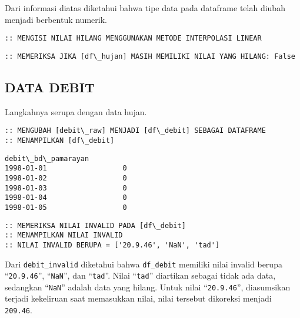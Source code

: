 \documentclass[11pt]{article}
\makeatletter
\newcommand{\boxspacing}{\kern\kvtcb@left@rule\kern\kvtcb@boxsep}
\newcommand{\prompt}[4]{
        \ttfamily\llap{{\color{#2}[#3]:\hspace{3pt}#4}}\vspace{-\baselineskip}
    }
\makeatother
\begin{document}
    Dari informasi diatas diketahui bahwa tipe data pada dataframe telah
diubah menjadi berbentuk numerik.

    \begin{Verbatim}[commandchars=\\\{\}]
:: MENGISI NILAI HILANG MENGGUNAKAN METODE INTERPOLASI LINEAR
    \end{Verbatim}

    \begin{Verbatim}[commandchars=\\\{\}]
:: MEMERIKSA JIKA [df\_hujan] MASIH MEMILIKI NILAI YANG HILANG: False
    \end{Verbatim}

    \hypertarget{data-debit}{%
\subsection{DATA DEBIT}\label{data-debit}}

Langkahnya serupa dengan data hujan.

    \begin{Verbatim}[commandchars=\\\{\}]
:: MENGUBAH [debit\_raw] MENJADI [df\_debit] SEBAGAI DATAFRAME
:: MENAMPILKAN [df\_debit]
    \end{Verbatim}

            \begin{tcolorbox}[breakable, size=fbox, boxrule=.5pt, pad at break*=1mm, opacityfill=0]
\prompt{Out}{outcolor}{0}{\boxspacing}
\begin{Verbatim}[commandchars=\\\{\}]
           debit\_bd\_pamarayan
1998-01-01                  0
1998-01-02                  0
1998-01-03                  0
1998-01-04                  0
1998-01-05                  0
\end{Verbatim}
\end{tcolorbox}
        
    \begin{Verbatim}[commandchars=\\\{\}]
:: MEMERIKSA NILAI INVALID PADA [df\_debit]
:: MENAMPILKAN NILAI INVALID
:: NILAI INVALID BERUPA = ['20.9.46', 'NaN', 'tad']
    \end{Verbatim}

    Dari \texttt{debit\_invalid} diketahui bahwa \texttt{df\_debit} memiliki
nilai invalid berupa ``\texttt{20.9.46}'', ``\texttt{NaN}'', dan
``\texttt{tad}''. Nilai ``\texttt{tad}'' diartikan sebagai tidak ada
data, sedangkan ``\texttt{NaN}'' adalah data yang hilang. Untuk nilai
``\texttt{20.9.46}'', diasumsikan terjadi kekeliruan saat memasukkan
nilai, nilai tersebut dikoreksi menjadi \texttt{209.46}.
\end{document}

